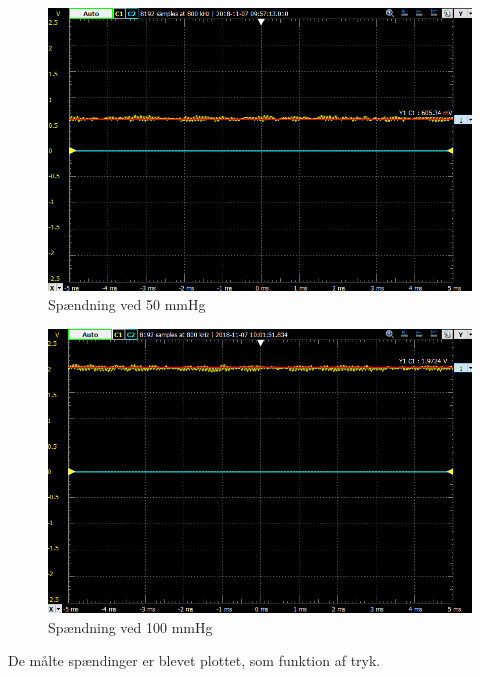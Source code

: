 \begin{figure}[h!]
	\centering
	\includegraphics[width=1\linewidth]{Hardware/50mmHg}
	\caption{Spændning ved 50 mmHg}
	\label{fig:50mmHg}
\end{figure}

\begin{figure}[h!]
	\centering
	\includegraphics[width=1\linewidth]{Hardware/100mmHg}
	\caption{Spændning ved 100 mmHg}
	\label{fig:100mmHg}
\end{figure}

De målte spændinger er blevet plottet, som funktion af tryk.

